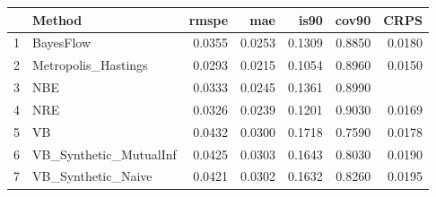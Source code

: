 \documentclass[12pt]{article}
\begin{document}
\thispagestyle{empty}
\begin{table}[ht]
\centering
\begin{tabular}{rlrrrrr}
  \hline
 & Method & rmspe & mae & is90 & cov90 & CRPS \\ 
  \hline
1 & BayesFlow & 0.0355 & 0.0253 & 0.1309 & 0.8850 & 0.0180 \\ 
  2 & Metropolis\_Hastings & 0.0293 & 0.0215 & 0.1054 & 0.8960 & 0.0150 \\ 
  3 & NBE & 0.0333 & 0.0245 & 0.1361 & 0.8990 &  \\ 
  4 & NRE & 0.0326 & 0.0239 & 0.1201 & 0.9030 & 0.0169 \\ 
  5 & VB & 0.0432 & 0.0300 & 0.1718 & 0.7590 & 0.0178 \\ 
  6 & VB\_Synthetic\_MutualInf & 0.0425 & 0.0303 & 0.1643 & 0.8030 & 0.0190 \\ 
  7 & VB\_Synthetic\_Naive & 0.0421 & 0.0302 & 0.1632 & 0.8260 & 0.0195 \\ 
   \hline
\end{tabular}
\end{table}
\end{document}
